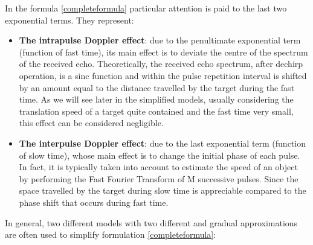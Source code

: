 In the formula \ref{completeformula} particular attention is paid to the last two exponential terms. They represent:

\begin{itemize}
     \item \textbf{The intrapulse Doppler effect}: due to the penultimate exponential term (function of fast time), its main effect is to deviate the centre of the spectrum of the received echo.
     Theoretically, the received echo spectrum, after dechirp operation, is a sinc function and within the pulse repetition interval is shifted by an amount equal to the distance travelled by the target during the fast time. As we will see later in the simplified models, usually considering the translation speed of a target quite contained and the fast time very small, this effect can be considered negligible.

         
    \item \textbf{The interpulse Doppler effect}: due to the last exponential term (function of slow time), whose main effect is to change the initial phase of each pulse. In fact, it is typically taken into account to estimate the speed of an object by performing the Fast Fourier Transform of M successive pulses. Since the space travelled by the target during slow time is appreciable compared to the phase shift that occurs during fast time.
    
\end{itemize}

In general, two different models with two different and gradual approximations are often used to simplify formulation \ref{completeformula}:

